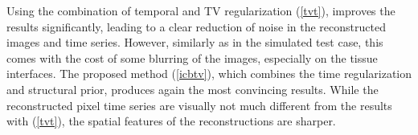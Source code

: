 Using the combination of temporal and TV regularization (\ref{tvt}), improves the results significantly, leading to a clear reduction of noise in the reconstructed images and time series. 
However, similarly as in the simulated test case, this comes with the cost of some blurring of the images, especially on the tissue interfaces.
The proposed method (\ref{icbtv}), which combines the time regularization and structural prior, produces again the most convincing results. 
While the reconstructed pixel time series are visually not much different from the results with (\ref{tvt}), the spatial features of the reconstructions are sharper.



